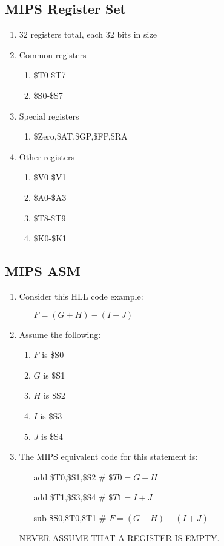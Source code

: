 \documentclass[12pt]{article}
\begin{document}
\subsection{MIPS Register Set}
\begin{enumerate}
  \item 32 registers total, each 32 bits in size
  \item Common registers
  \begin{enumerate}
    \item \$T0-\$T7
    \item \$S0-\$S7
  \end{enumerate}
  \item Special registers
  \begin{enumerate}
    \item \$Zero,\$AT,\$GP,\$FP,\$RA
  \end{enumerate}
  \item Other registers
  \begin{enumerate}
    \item \$V0-\$V1
    \item \$A0-\$A3
    \item \$T8-\$T9
    \item \$K0-\$K1
  \end{enumerate}
\end{enumerate}



\subsection{MIPS ASM}
\begin{enumerate}
  \item Consider this HLL code example:
  \begin{enumerate}
    \item[] $F=(G+H)-(I+J)$
  \end{enumerate}
  \item Assume the following:
  \begin{enumerate}
    \item $F$ is \$S0
    \item $G$ is \$S1
    \item $H$ is \$S2
    \item $I$ is \$S3
    \item $J$ is \$S4
  \end{enumerate}
  \item The MIPS equivalent code for this statement is:
  \begin{enumerate}
    \item[add] \$T0,\$S1,\$S2 \# $\$T0=G+H$
    \item[add] \$T1,\$S3,\$S4 \# $\$T1=I+J$
    \item[sub] \$S0,\$T0,\$T1 \# $F=(G+H)-(I+J)$
  \end{enumerate}
  \item[] NEVER ASSUME THAT A REGISTER IS EMPTY.
\end{enumerate}
\end{document}
